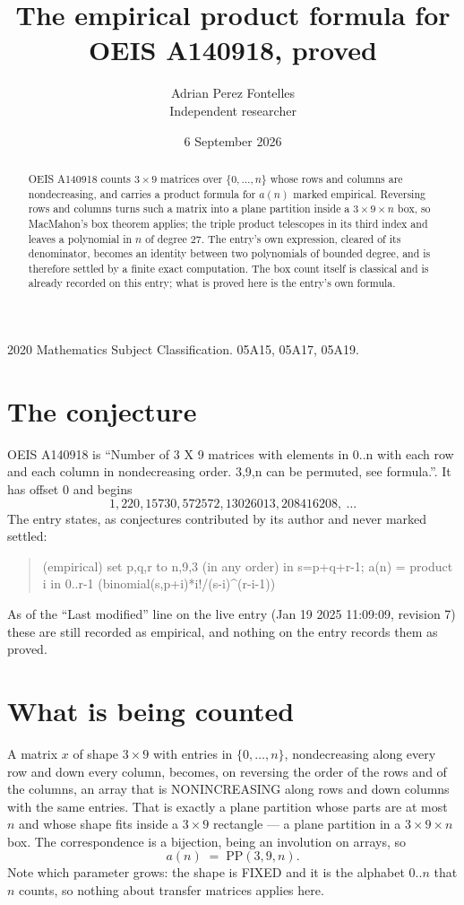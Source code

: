 \documentclass[11pt,a4paper]{article}
\title{The empirical product formula for OEIS A140918, proved}
\author{Adrian Perez Fontelles\\ \small Independent researcher}
\date{6 September 2026}
\theoremstyle{plain}
\theoremstyle{definition}
\begin{document}
\maketitle

\begin{abstract}
OEIS A140918 counts $3\times9$ matrices over $\{0,\dots,n\}$ whose rows and columns are
nondecreasing, and carries a product formula for $a(n)$ marked empirical. Reversing rows and
columns turns such a matrix into a plane partition inside a $3\times9\times n$ box, so
MacMahon's box theorem applies; the triple product telescopes in its third index and leaves a
polynomial in $n$ of degree $27$. The entry's own expression, cleared of its denominator,
becomes an identity between two polynomials of bounded degree, and is therefore settled by a
finite exact computation. The box count itself is classical and is already recorded on this
entry; what is proved here is the entry's own formula.
\end{abstract}

\noindent\small 2020 Mathematics Subject Classification. 05A15, 05A17, 05A19.\normalsize

\section{The conjecture}

OEIS A140918 is ``Number of 3 X 9 matrices with elements in 0..n with each row and each column in nondecreasing order. 3,9,n can be permuted, see formula.''. It has offset $0$ and begins
\[
1, 220, 15730, 572572, 13026013, 208416208,\ \dots
\]
The entry states, as conjectures contributed by its author and never marked settled:
\begin{quote}
(empirical) set p,q,r to n,9,3 (in any order) in s=p+q+r-1; a(n) = product {i in 0..r-1} (binomial(s,p+i)*i!/(s-i)\^{}(r-i-1))

\end{quote}
As of the ``Last modified'' line on the live entry (Jan 19 2025 11:09:09, revision 7) these are still
recorded as empirical, and nothing on the entry records them as proved.

\section{What is being counted}

A matrix $x$ of shape $3\times9$ with entries in $\{0,\dots,n\}$, nondecreasing along
every row and down every column, becomes, on reversing the order of the rows and of the
columns, an array that is NONINCREASING along rows and down columns with the same entries. That
is exactly a plane partition whose parts are at most $n$ and whose shape fits inside a
$3\times9$ rectangle --- a plane partition in a $3\times9\times n$ box. The
correspondence is a bijection, being an involution on arrays, so
\[
a(n)\;=\;\mathrm{PP}(3,9,n).
\]
Note which parameter grows: the shape is FIXED and it is the alphabet $0..n$ that $n$ counts,
so nothing about transfer matrices applies here.
\end{document}
